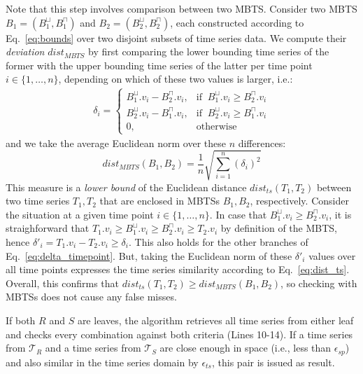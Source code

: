 Note that this step involves comparison between two MBTS. Consider two MBTS $B_1 = (B_1^{\sqcup}, B_1^{\sqcap})$ and $B_2 = (B_2^{\sqcup}, B_2^{\sqcap})$, each constructed according to Eq.~\ref{eq:bounds} over two disjoint subsets of time series data. We compute their {\em deviation} $dist_{MBTS}$ by first comparing the lower bounding time series of the former with the upper bounding time series of the latter per time point $i \in \{ 1, \dots, n \}$, depending on which of these two values is larger, i.e.:
\begin{equation}
 \begin{split}
  \delta_i = \begin{cases}
  B_1^{\sqcup}.v_i - B_2^{\sqcap}.v_i, & \text{if} \;\; B_1^{\sqcup}.v_i \geq B_2^{\sqcap}.v_i \\
  B_2^{\sqcup}.v_i - B_1^{\sqcap}.v_i, & \text{if} \;\; B_2^{\sqcup}.v_i \geq B_1^{\sqcap}.v_i \\
  0, & \text{otherwise}
    \end{cases}
 \end{split}
 \label{eq:delta_timepoint}
\end{equation}
\noindent and we take the average Euclidean norm over these $n$ differences:
\begin{equation} \label{eq:dist_mbts}
dist_{MBTS}(B_1, B_2) = \frac{1}{n}\sqrt{\displaystyle \sum_{i=1}^{n}({\delta}_i)^2}
\end{equation}
This measure is a {\em lower bound} of the Euclidean distance $dist_{ts}(T_1, T_2)$  between two time series $T_1, T_2$ that are enclosed in MBTSs $B_1, B_2$, respectively. Consider the situation at a given time point $i \in \{ 1, \dots, n \}$. In case that $B_1^{\sqcup}.v_i \geq B_2^{\sqcap}.v_i$, it is straighforward that $T_1.v_i \geq B_1^{\sqcup}.v_i \geq B_2^{\sqcap}.v_i \geq T_2.v_i$ by definition of the MBTS, hence ${\delta}'_i = T_1.v_i - T_2.v_i \geq {\delta}_i$. This also holds for the other branches of Eq.~\ref{eq:delta_timepoint}. But, taking the Euclidean norm of these ${\delta}'_i$ values over all time points expresses the time series similarity according to Eq.~\ref{eq:dist_ts}. Overall, this confirms that $dist_{ts}(T_1, T_2) \geq dist_{MBTS}(B_1, B_2)$, so checking with MBTSs does not cause any false misses.
   
If both $R$ and $S$ are leaves, the algorithm retrieves all time series from either leaf and checks every combination against both criteria (Lines 10-14). If a time series from $\mathcal{T}_{R}$ and a time series from $\mathcal{T}_{S}$ are close enough in space (i.e., less than $\epsilon_{sp}$) and also similar in the time series domain by $\epsilon_{ts}$, this pair is issued as result.

